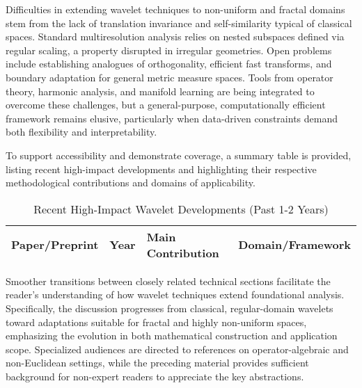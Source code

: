 \documentclass[sigconf]{acmart}
\begin{document}
Difficulties in extending wavelet techniques to non-uniform and fractal domains stem from the lack of translation invariance and self-similarity typical of classical spaces. Standard multiresolution analysis relies on nested subspaces defined via regular scaling, a property disrupted in irregular geometries. Open problems include establishing analogues of orthogonality, efficient fast transforms, and boundary adaptation for general metric measure spaces. Tools from operator theory, harmonic analysis, and manifold learning are being integrated to overcome these challenges, but a general-purpose, computationally efficient framework remains elusive, particularly when data-driven constraints demand both flexibility and interpretability.

To support accessibility and demonstrate coverage, a summary table is provided, listing recent high-impact developments and highlighting their respective methodological contributions and domains of applicability.

\begin{table*}[htbp]
\centering
\caption{Recent High-Impact Wavelet Developments (Past 1-2 Years)}
\label{tab:recent_wavelet_work}
\begin{adjustbox}{max width=\textwidth}
\begin{tabular}{@{}llll@{}}
\toprule
\textbf{Paper/Preprint} & \textbf{Year} & \textbf{Main Contribution} & \textbf{Domain/Framework} \\
\midrule
\bottomrule
\end{tabular}
\end{adjustbox}
\end{table*}

Smoother transitions between closely related technical sections facilitate the reader’s understanding of how wavelet techniques extend foundational analysis. Specifically, the discussion progresses from classical, regular-domain wavelets toward adaptations suitable for fractal and highly non-uniform spaces, emphasizing the evolution in both mathematical construction and application scope. Specialized audiences are directed to references on operator-algebraic and non-Euclidean settings, while the preceding material provides sufficient background for non-expert readers to appreciate the key abstractions.
\end{document}

